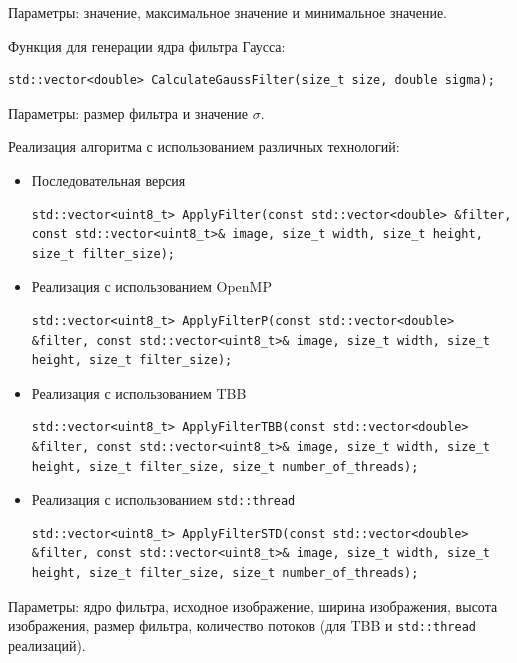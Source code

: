 \documentclass{report}
\begin{document}
Параметры: значение, максимальное значение и минимальное значение.

Функция для генерации ядра фильтра Гаусса:

\begin{lstlisting}[numbers=none]
std::vector<double> CalculateGaussFilter(size_t size, double sigma);
\end{lstlisting}

Параметры: размер фильтра и значение $\sigma$.

Реализация алгоритма с использованием различных технологий:
\begin{itemize}
    \item Последовательная версия
    \begin{lstlisting}[breaklines=true, numbers=none]
std::vector<uint8_t> ApplyFilter(const std::vector<double> &filter, const std::vector<uint8_t>& image, size_t width, size_t height, size_t filter_size);
    \end{lstlisting}

    \item Реализация с использованием OpenMP
    \begin{lstlisting}[breaklines=true, numbers=none]
std::vector<uint8_t> ApplyFilterP(const std::vector<double> &filter, const std::vector<uint8_t>& image, size_t width, size_t height, size_t filter_size);
    \end{lstlisting}

    \item Реализация с использованием TBB
    
    \begin{lstlisting}[breaklines=true, numbers=none]
std::vector<uint8_t> ApplyFilterTBB(const std::vector<double> &filter, const std::vector<uint8_t>& image, size_t width, size_t height, size_t filter_size, size_t number_of_threads);
    \end{lstlisting}

    \item Реализация с использованием \verb|std::thread|
    \begin{lstlisting}[breaklines=true, numbers=none]
std::vector<uint8_t> ApplyFilterSTD(const std::vector<double> &filter, const std::vector<uint8_t>& image, size_t width, size_t height, size_t filter_size, size_t number_of_threads);
    \end{lstlisting}

\end{itemize}

Параметры: ядро фильтра, исходное изображение, ширина изображения, высота изображения, размер фильтра, количество потоков (для TBB и \verb|std::thread| реализаций).
\newpage
\end{document}
